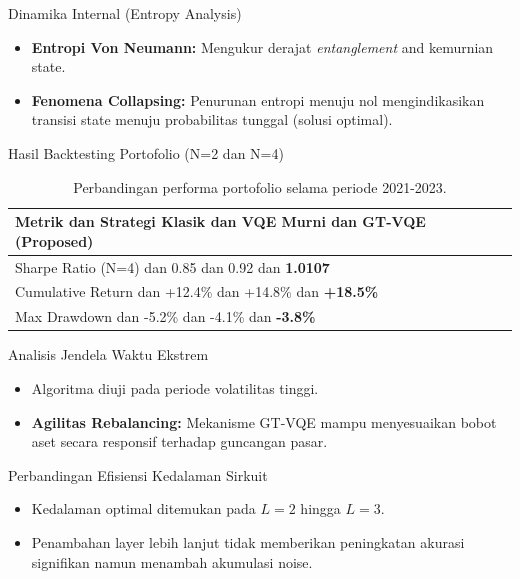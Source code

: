 \documentclass[aspectratio=169]{beamer}
\begin{document}
\begin{frame}{Dinamika Internal (Entropy Analysis)}
    \begin{itemize}
        \item \textbf{Entropi Von Neumann:} Mengukur derajat \textit{entanglement} and kemurnian state.
        \item \textbf{Fenomena Collapsing:} Penurunan entropi menuju nol mengindikasikan transisi state menuju probabilitas tunggal (solusi optimal).
    \end{itemize}
\end{frame}

\begin{frame}{Hasil Backtesting Portofolio (N=2  dan   N=4)}
    \begin{table}[]
        \centering
        \begin{tabular}{@{}lccc@{}}
        \toprule
        Metrik dan  Strategi Klasik dan  VQE Murni dan  \textbf{GT-VQE (Proposed)} \\ \midrule
        Sharpe Ratio (N=4) dan  0.85 dan  0.92 dan  \textbf{1.0107} \\
        Cumulative Return dan  +12.4\% dan  +14.8\% dan  \textbf{+18.5\%} \\
        Max Drawdown dan  -5.2\% dan  -4.1\% dan  \textbf{-3.8\%} \\ \bottomrule
        \end{tabular}
        \caption{Perbandingan performa portofolio selama periode 2021-2023.}
    \end{table}
\end{frame}

\begin{frame}{Analisis Jendela Waktu Ekstrem}
    \begin{itemize}
        \item Algoritma diuji pada periode volatilitas tinggi.
        \item \textbf{Agilitas Rebalancing:} Mekanisme GT-VQE mampu menyesuaikan bobot aset secara responsif terhadap guncangan pasar.
    \end{itemize}
\end{frame}

\begin{frame}{Perbandingan Efisiensi Kedalaman Sirkuit}
    \begin{itemize}
        \item Kedalaman optimal ditemukan pada $L=2$ hingga $L=3$.
        \item Penambahan layer lebih lanjut tidak memberikan peningkatan akurasi signifikan namun menambah akumulasi noise.
    \end{itemize}
\end{frame}
\end{document}
